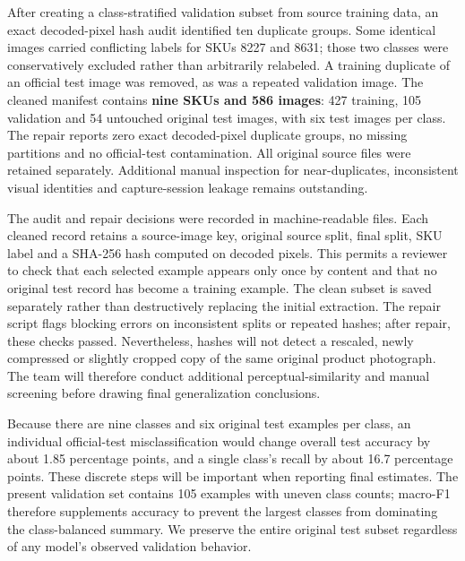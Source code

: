\documentclass[sigconf,nonacm]{acmart}
\begin{document}
After creating a class-stratified validation subset from source training data, an exact decoded-pixel hash audit identified ten duplicate groups. Some identical images carried conflicting labels for SKUs 8227 and 8631; those two classes were conservatively excluded rather than arbitrarily relabeled. A training duplicate of an official test image was removed, as was a repeated validation image. The cleaned manifest contains \textbf{nine SKUs and 586 images}: 427 training, 105 validation and 54 untouched original test images, with six test images per class. The repair reports zero exact decoded-pixel duplicate groups, no missing partitions and no official-test contamination. All original source files were retained separately. Additional manual inspection for near-duplicates, inconsistent visual identities and capture-session leakage remains outstanding.


The audit and repair decisions were recorded in machine-readable files. Each cleaned record retains a source-image key, original source split, final split, SKU label and a SHA-256 hash computed on decoded pixels. This permits a reviewer to check that each selected example appears only once by content and that no original test record has become a training example. The clean subset is saved separately rather than destructively replacing the initial extraction. The repair script flags blocking errors on inconsistent splits or repeated hashes; after repair, these checks passed. Nevertheless, hashes will not detect a rescaled, newly compressed or slightly cropped copy of the same original product photograph. The team will therefore conduct additional perceptual-similarity and manual screening before drawing final generalization conclusions.

Because there are nine classes and six original test examples per class, an individual official-test misclassification would change overall test accuracy by about 1.85 percentage points, and a single class's recall by about 16.7 percentage points. These discrete steps will be important when reporting final estimates. The present validation set contains 105 examples with uneven class counts; macro-F1 therefore supplements accuracy to prevent the largest classes from dominating the class-balanced summary. We preserve the entire original test subset regardless of any model's observed validation behavior.
\end{document}
